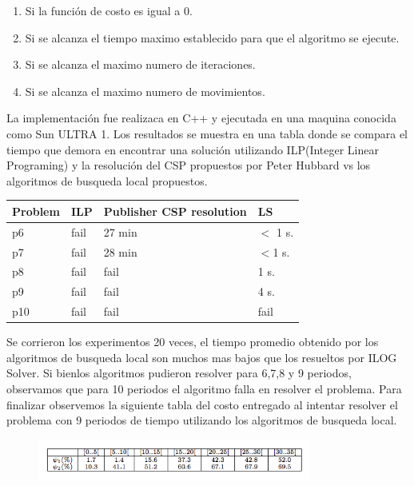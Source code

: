 \documentclass[spanish, fleqn]{article}
\begin{document}
\begin{itemize}
\begin{enumerate}
	\item Si la función de costo es igual a 0.
	\item Si se alcanza el tiempo maximo establecido para que el algoritmo se ejecute.
	\item Si se alcanza el maximo numero de iteraciones.
	\item Si se alcanza el maximo numero de movimientos.
\end{enumerate}

La implementación fue realizaca en C++ y ejecutada en una maquina conocida como Sun ULTRA 1. Los resultados se muestra en una tabla donde se compara el tiempo que demora en encontrar una solución utilizando ILP(Integer Linear Programing) y la resolución del CSP propuestos por Peter Hubbard vs los algoritmos de busqueda local propuestos.

\newpage


\begin{table}[h!]
\centering
   \begin{tabular}{|l|l|l|l|}
    \hline
    Problem & ILP  & Publisher CSP resolution & LS     \\ \hline
    p6      & fail & 27 min                   & $<$ 1 s. \\
    p7      & fail & 28 min                   & $<$1 s. \\
    p8      & fail & fail                     & 1 s.   \\
    p9      & fail & fail                     & 4 s.   \\
    p10     & fail & fail                     & fail   \\ \hline
    \end{tabular}
\end{table}

Se corrieron los experimentos 20 veces, el tiempo promedio obtenido por los algoritmos de busqueda local son muchos mas bajos que los resueltos por ILOG Solver. Si bienlos algoritmos  pudieron resolver para 6,7,8 y 9 periodos, observamos que para 10 periodos el algoritmo falla en resolver el problema. Para finalizar observemos la siguiente tabla del costo entregado al intentar resolver el problema con 9 periodos de tiempo utilizando los algoritmos de  busqueda local.

\begin{figure}[!h]
  \centering
    \includegraphics[width=0.8\textwidth]{4}
  \label{fig:DiagramaBarra5}
\end{figure}


\end{itemize}
\end{document}
